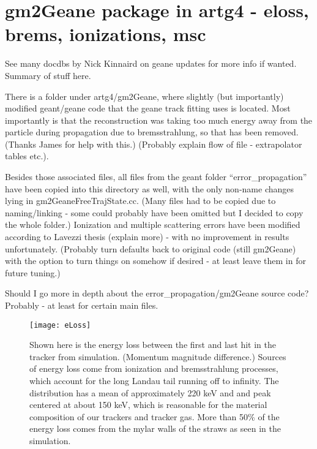 \section{gm2Geane package in artg4 - eloss, brems, ionizations, msc}
\label{sec:gm2Geane}

See many docdbs by Nick Kinnaird on geane updates for more info if wanted. Summary of stuff here.


  There is a folder under artg4/gm2Geane, where slightly (but importantly) modified geant/geane code that the geane track fitting uses is located. Most importantly is that the reconstruction was taking too much energy away from the particle during propagation due to bremsstrahlung, so that has been removed. (Thanks James for help with this.) (Probably explain flow of file - extrapolator tables etc.).

  Besides those associated files, all files from the geant folder ``error\_propagation'' have been copied into this directory as well, with the only non-name changes lying in gm2GeaneFreeTrajState.cc. (Many files had to be copied due to naming/linking - some could probably have been omitted but I decided to copy the whole folder.) Ionization and multiple scattering errors have been modified according to Lavezzi thesis (explain more) - with no improvement in results unfortunately. (Probably turn defaults back to original code (still gm2Geane) with the option to turn things on somehow if desired - at least leave them in for future tuning.)

Should I go more in depth about the error\_propagation/gm2Geane source code? Probably - at least for certain main files.

\cite{energyloss}

\begin{figure}[]
\caption{Shown here is the energy loss between the first and last hit in the tracker from simulation. (Momentum magnitude difference.) Sources of energy loss come from ionization and bremsstrahlung processes, which account for the long Landau tail running off to infinity. The distribution has a mean of approximately 220 keV and and peak centered at about 150 keV, which is reasonable for the material composition of our trackers and tracker gas. More than 50\% of the energy loss comes from the mylar walls of the straws as seen in the simulation.}
\centering
\texttt{[image: eLoss]}
\label{fig:eLoss}
\end{figure}

